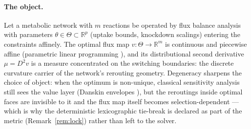 \documentclass[11pt,a4paper]{article}
\theoremstyle{plain}
\theoremstyle{definition}
\theoremstyle{remark}
\newcommand{\RR}{\mathbb{R}}
\begin{document}
\paragraph{The object.}
Let a metabolic network with $m$ reactions be operated by flux balance
analysis \citep{varma1994, orth2010} with parameters $\theta \in \Theta \subset \RR^p$
(uptake bounds, knockdown scalings) entering the constraints
affinely. The optimal flux map $v : \Theta \to \RR^m$ is continuous
and piecewise affine (parametric linear programming
\citep{borrelli2003}), and its distributional second derivative
$\mu = D^2 v$ is a measure concentrated on the switching boundaries:
the discrete curvature carrier of the network's rerouting geometry.
Degeneracy sharpens the choice of object: when the optimum is
non-unique, classical sensitivity analysis still sees the value layer
(Danskin envelopes \citep{danskin1967}), but the reroutings inside
optimal faces are invisible to it and the flux map itself becomes
selection-dependent --- which is why the deterministic lexicographic
tie-break is declared as part of the metric (Remark~\ref{rem:lock})
rather than left to the solver.
\end{document}

